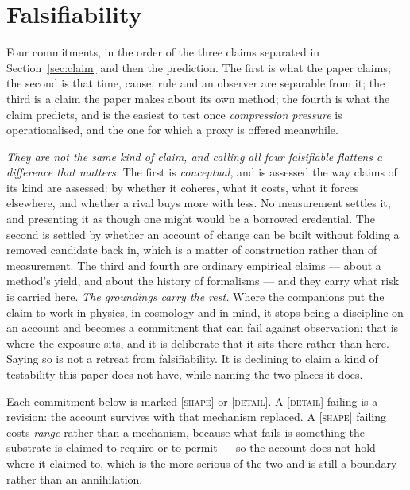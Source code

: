 \documentclass[11pt,a4paper]{article}
\begin{document}
\section{Falsifiability}\label{sec:falsifiability}
Four commitments, in the order of the three claims separated in Section~\ref{sec:claim} and then the
prediction. The first is what the paper claims; the second is that time, cause, rule and an observer
are separable from it; the third is a claim the paper makes about its own method; the fourth is what
the claim predicts, and is the easiest to test once \emph{compression pressure} is operationalised, and
the one for which a proxy is offered meanwhile.

\emph{They are not the same kind of claim, and calling all four falsifiable flattens a difference that
matters.} The first is \emph{conceptual}, and is assessed the way claims of its kind are assessed: by
whether it coheres, what it costs, what it forces elsewhere, and whether a rival buys more with less.
No measurement settles it, and presenting it as though one might would be a borrowed credential. The
second is settled by whether an account of change can be built without folding a removed candidate back
in, which is a matter of construction rather than of measurement. The third and fourth are ordinary
empirical claims --- about a method's yield, and about the history of formalisms --- and they carry
what risk is carried here. \emph{The groundings carry the rest.}
Where the companions put the claim to work in physics, in cosmology and in mind, it stops being a
discipline on an account and becomes a commitment that can fail against observation; that is where the
exposure sits, and it is deliberate that it sits there rather than here. Saying so is not a retreat
from falsifiability. It is declining to claim a kind of testability this paper does not have, while
naming the two places it does.

Each commitment below is marked \textsc{[shape]} or \textsc{[detail]}. A \textsc{[detail]} failing is
a revision: the account survives with that mechanism replaced. A \textsc{[shape]} failing costs
\emph{range} rather than a mechanism, because what fails is something the substrate is claimed to
require or to permit --- so the account does not hold where it claimed to, which is the more serious
of the two and is still a boundary rather than an annihilation.
\end{document}
